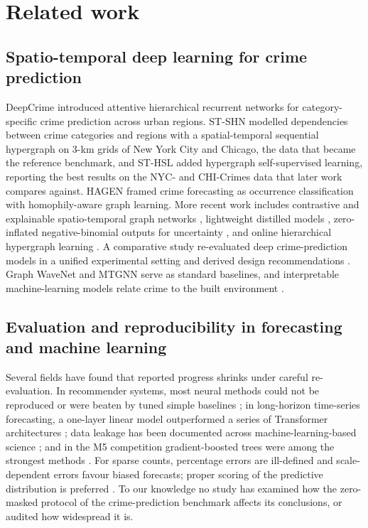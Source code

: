 \documentclass[preprint,12pt,authoryear]{elsarticle}
\begin{document}
\section{Related work}\label{sec:related}

\subsection{Spatio-temporal deep learning for crime prediction}
DeepCrime \citep{huang2018deepcrime} introduced attentive hierarchical recurrent networks for category-specific crime prediction across urban regions. ST-SHN \citep{xia2021stshn} modelled dependencies between crime categories and regions with a spatial-temporal sequential hypergraph on 3-km grids of New York City and Chicago, the data that became the reference benchmark, and ST-HSL \citep{li2022sthsl} added hypergraph self-supervised learning, reporting the best results on the NYC- and CHI-Crimes data that later work compares against. HAGEN \citep{wang2022hagen} framed crime forecasting as occurrence classification with homophily-aware graph learning. More recent work includes contrastive and explainable spatio-temporal graph networks \citep{tang2023cl4st,tang2023stexplainer}, lightweight distilled models \citep{tang2024easyst}, zero-inflated negative-binomial outputs for uncertainty \citep{wang2024uncertainty}, and online hierarchical hypergraph learning \citep{sthhol2026}. A comparative study re-evaluated deep crime-prediction models in a unified experimental setting and derived design recommendations \citep{deepcrime2024experiments}. Graph WaveNet \citep{wu2019graphwavenet} and MTGNN \citep{wu2020mtgnn} serve as standard baselines, and interpretable machine-learning models relate crime to the built environment \citep{zhang2022interpretable}.

\subsection{Evaluation and reproducibility in forecasting and machine learning}
Several fields have found that reported progress shrinks under careful re-evaluation. In recommender systems, most neural methods could not be reproduced or were beaten by tuned simple baselines \citep{dacrema2019progress}; in long-horizon time-series forecasting, a one-layer linear model outperformed a series of Transformer architectures \citep{zeng2023transformers}; data leakage has been documented across machine-learning-based science \citep{kapoor2023leakage}; and in the M5 competition gradient-boosted trees were among the strongest methods \citep{makridakis2022m5}. For sparse counts, percentage errors are ill-defined and scale-dependent errors favour biased forecasts; proper scoring of the predictive distribution is preferred \citep{hyndman2006another,czado2009predictive,kolassa2016evaluating,gneiting2007strictly}. To our knowledge no study has examined how the zero-masked protocol of the crime-prediction benchmark affects its conclusions, or audited how widespread it is.
\end{document}
